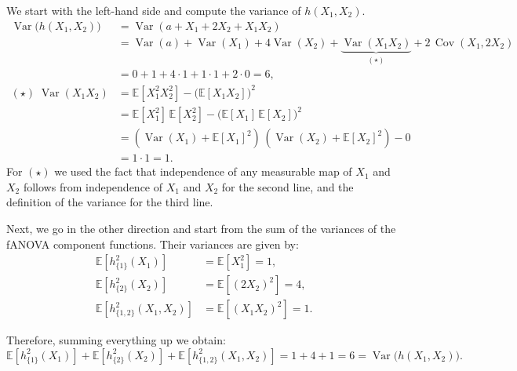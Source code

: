 We start with the left-hand side and compute the variance of $h(X_1,X_2)$.
\begin{align*}
\operatorname{Var}\big(h(X_1,X_2)\big)
&= \operatorname{Var}(a + X_1 + 2X_2 + X_1X_2) \\
&= \operatorname{Var}(a) + \operatorname{Var}(X_1) + 4\operatorname{Var}(X_2)
   + \underbrace{\operatorname{Var}(X_1X_2)}_{(\star)}
   + 2\,\operatorname{Cov}(X_1,2X_2) \\
&= 0 + 1 + 4 \cdot 1 + 1 \cdot 1 + 2\cdot 0 = 6, \\[0.3em]
(\star)\;\operatorname{Var}(X_1X_2)
&= \mathbb{E}[X_1^2 X_2^2] - \big(\mathbb{E}[X_1 X_2]\big)^2 \\
&=\mathbb{E}[X_1^2]\,\mathbb{E}[X_2^2]
   - \big(\mathbb{E}[X_1]\,\mathbb{E}[X_2]\big)^2 \\
&= (\operatorname{Var}(X_1)+\mathbb{E}[X_1]^2)\,
   (\operatorname{Var}(X_2)+\mathbb{E}[X_2]^2) - 0 \\
&= 1\cdot 1 = 1.
\end{align*}
For $(\star)$ we used the fact that independence of any measurable map of $X_1$ and $X_2$ follows from independence of $X_1$ and $X_2$ for the second line, and the definition of the variance for the third line.

Next, we go in the other direction and start from the sum of the variances of the fANOVA component functions.
Their variances are given by:
\begin{align*}
\mathbb{E}[h_{\{1\}}^2(X_1)] 
    &= \mathbb{E}[X_1^2] 
    = 1, \\[0.5em]
\mathbb{E}[h_{\{2\}}^2(X_2)] 
    &= \mathbb{E}[(2X_2)^2] 
    = 4, \\[0.5em]
\mathbb{E}[h_{\{1,2\}}^2(X_1,X_2)] 
    &= \mathbb{E}[(X_1 X_2)^2] 
    = 1.
\end{align*}

Therefore, summing everything up we obtain:
\[
 \mathbb{E}[h_{\{1\}}^2(X_1)] + \mathbb{E}[h_{\{2\}}^2(X_2)] + \mathbb{E}[h_{\{1,2\}}^2(X_1,X_2)] 
 = 1 + 4 + 1 = 6
 = \operatorname{Var}\big(h(X_1,X_2)\big).
\]








